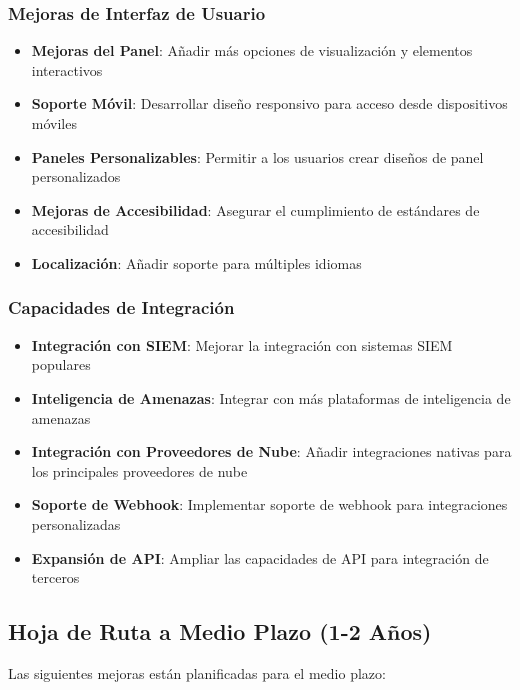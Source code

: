 \subsubsection{Mejoras de Interfaz de Usuario}
\begin{itemize}
    \item \textbf{Mejoras del Panel}: Añadir más opciones de visualización y elementos interactivos
    \item \textbf{Soporte Móvil}: Desarrollar diseño responsivo para acceso desde dispositivos móviles
    \item \textbf{Paneles Personalizables}: Permitir a los usuarios crear diseños de panel personalizados
    \item \textbf{Mejoras de Accesibilidad}: Asegurar el cumplimiento de estándares de accesibilidad
    \item \textbf{Localización}: Añadir soporte para múltiples idiomas
\end{itemize}

\subsubsection{Capacidades de Integración}
\begin{itemize}
    \item \textbf{Integración con SIEM}: Mejorar la integración con sistemas SIEM populares
    \item \textbf{Inteligencia de Amenazas}: Integrar con más plataformas de inteligencia de amenazas
    \item \textbf{Integración con Proveedores de Nube}: Añadir integraciones nativas para los principales proveedores de nube
    \item \textbf{Soporte de Webhook}: Implementar soporte de webhook para integraciones personalizadas
    \item \textbf{Expansión de API}: Ampliar las capacidades de API para integración de terceros
\end{itemize}

\subsection{Hoja de Ruta a Medio Plazo (1-2 Años)}
Las siguientes mejoras están planificadas para el medio plazo:

